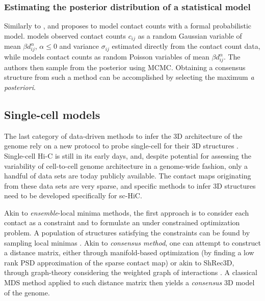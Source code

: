 \documentclass[2columns]{article}
\begin{document}
\subsubsection*{Estimating the posterior distribution of a statistical model}

Similarly to \citet{varoquaux:statistical}, \citet{rousseau:three} and
\citet{hu:bayesian} proposes to model contact counts with a formal
probabilistic model. \citet{rousseau:three} models observed contact counts
$c_{ij}$ as a random Gaussian variable of mean $\beta d_{ij}^{\alpha}$,
$\alpha \leq 0$ and variance $\sigma_{ij}$ estimated directly from the contact
count data, while \citet{hu:bayesian} models contact counts as random Poisson
variables of mean $\beta d_{ij}^\alpha$. The authors then sample from the
posterior using MCMC. Obtaining a consensus structure from such a method can
be accomplished by selecting the maximum {\em a posteriori}.

\subsection*{Single-cell models}

The last category of data-driven methods to infer the 3D architecture of the
genome rely on a new protocol to probe single-cell for their 3D structures
\citep{nagano:single-cell,ramani:massively}. Single-cell Hi-C is still in its
early days, and, despite potential for assessing the variability of
cell-to-cell genome architecture in a genome-wide fashion, only a handful of
data sets are today publicly available. The contact maps originating from
these data sets are very sparse, and specific methods to infer 3D structures
need to be developed specifically for sc-HiC. 

Akin to {\em ensemble}-local minima methods,  the first approach is to
consider each contact as a constraint and to formulate an under constrained
optimization problem. A population of structures satisfying the constraints
can be found by sampling local minimas \citep{nagano:single-cell}.
Akin to {\em consensus method}, one can attempt to construct a distance
matrix, either through manifold-based optimization \citep{paulsen:manifold}
(by finding a low rank PSD approximation of the sparse contact map) or
akin to ShRec3D, through graph-theory considering the weighted graph of
interactions \citep{hirata:three-dimensional}. A classical MDS method applied
to such distance matrix then yields a \textit{consensus} 3D model of the genome.
\end{document}
